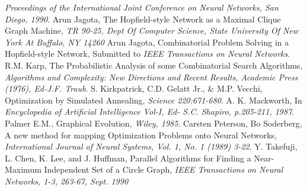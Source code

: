 \begin{thebibliography}{160}
{{\em Proceedings of the International Joint Conference on Neural
Networks, San Diego, 1990}.
 Arun Jagota, 
The Hopfield-style Network as a Maximal Clique Graph Machine,
{\em TR 90-25, Dept Of Computer Science,
State University Of New York At Buffalo, NY 14260 }
 Arun Jagota, 
Combinatorial Problem Solving in a Hopfield-style Network,
Submitted to {\em IEEE Transactions on Neural Networks}.
R.M. Karp,
The Probabilistic Analysis of some Combinatorial Search Algorithms,
{\em Algorithms and Complexity: New Directions and Recent Results, 
Academic Press (1976), Ed-J.F. Traub}.
 S. Kirkpatrick, C.D. Gelatt Jr., \& M.P. Vecchi,
Optimization by Simulated Annealing,
{\em Science 220:671-680}.
A. K. Mackworth, In
{\em Encyclopedia of Artificial Intelligence Vol-I, Ed- S.C. Shapiro, p.205-211, 1987}.
Palmer E.M.,
Graphical Evolution, 
{\em Wiley, 1985}.
Carsten Peterson, Bo Soderberg, 
A new method for mapping Optimization Problems onto Neural Networks,
{\em International Journal of Neural Systems, Vol. 1, No. 1 (1989) 3-22}.
Y. Takefuji, L. Chen, K. Lee, and J. Huffman,
Parallel Algorithms for Finding a Near-Maximum Independent Set of
a Circle Graph,
{\em IEEE Transactions on Neural Networks, 1-3, 263-67, Sept. 1990}
}
\end{thebibliography}

